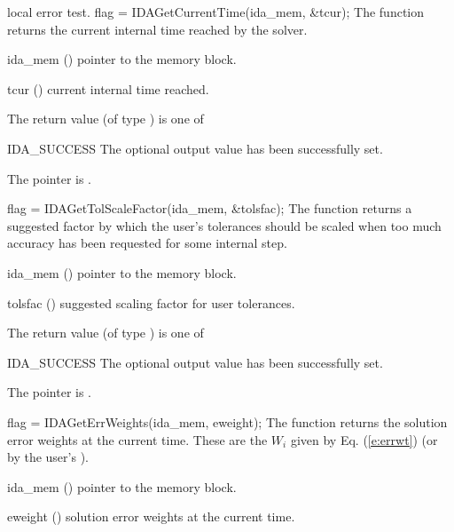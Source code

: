 {{  local error test.
}
{
  flag = IDAGetCurrentTime(ida\_mem, \&tcur);
}
{
  The function  returns the
  current internal time reached by the solver.
}
{
  \begin{args}
  \item[ida\_mem] ()
    pointer to the {\ida} memory block.
  \item[tcur] ()
    current internal time reached.
  \end{args}
}
{
  The return value  (of type ) is one of
  \begin{args}
  \item[IDA\_SUCCESS] 
    The optional output value has been successfully set.
  \item[\Id{IDA\_MEM\_NULL}]
    The  pointer is .
  \end{args}
}
{}
{
  flag = IDAGetTolScaleFactor(ida\_mem, \&tolsfac);
}
{
  The function  returns a
  suggested factor by which the user's tolerances 
  should be scaled when too much accuracy has been 
  requested for some internal step.
}
{
  \begin{args}[tolsfac]
  \item[ida\_mem] ()
    pointer to the {\ida} memory block.
  \item[tolsfac] ()
    suggested scaling factor for user tolerances.
  \end{args}
}
{
  The return value  (of type ) is one of
  \begin{args}
  \item[IDA\_SUCCESS] 
    The optional output value has been successfully set.
  \item[\Id{IDA\_MEM\_NULL}]
    The  pointer is .
  \end{args}
}
{}
{
  flag = IDAGetErrWeights(ida\_mem, eweight);
}
{
  The function  returns the solution error weights 
  at the current time. These are the $W_i$ given by Eq. (\ref{e:errwt})
  (or by the user's ).
}
{
  \begin{args}[eweight]
  \item[ida\_mem] ()
    pointer to the {\ida} memory block.
  \item[eweight] ()
    solution error weights at the current time.

\end{args}}}
